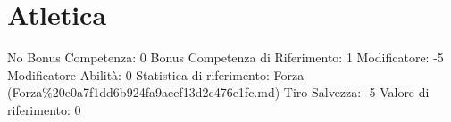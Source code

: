 \section{Atletica}\label{atletica}

\begin{description}
\tightlist
\item[Tags: ABI]
No Bonus Competenza: 0 Bonus Competenza di Riferimento: 1 Modificatore:
-5 Modificatore Abilità: 0 Statistica di riferimento: Forza
(Forza\%20e0a7f1dd6b924fa9aeef13d2c476e1fc.md) Tiro Salvezza: -5 Valore
di riferimento: 0
\end{description}
